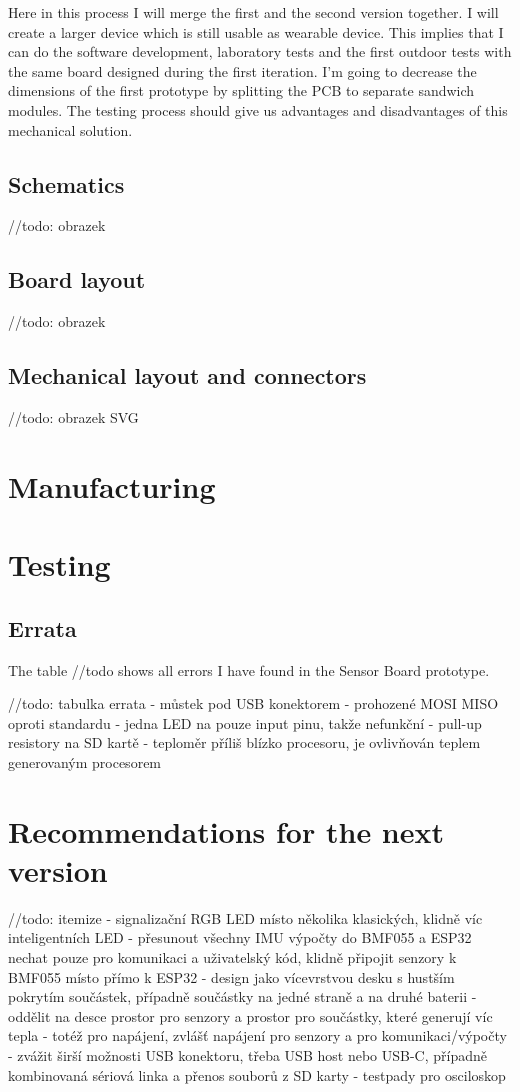 \documentclass[12pt,a4paper]{article}
\begin{document}
Here in this process I will merge the first and the second version together. I will create a larger device which is still usable as wearable device. This implies that I can do the software development, laboratory tests and the first outdoor tests with the same board designed during the first iteration. I'm going to decrease the dimensions of the first prototype by splitting the PCB to separate sandwich modules. The testing process should give us advantages and disadvantages of this mechanical solution.

\subsection{Schematics}
//todo: obrazek

\subsection{Board layout}
//todo: obrazek

\subsection{Mechanical layout and connectors}
//todo: obrazek SVG

\section{Manufacturing}

\section{Testing}

\subsection{Errata}
The table //todo shows all errors I have found in the Sensor Board prototype.

//todo: tabulka errata
- můstek pod USB konektorem
- prohozené MOSI MISO oproti standardu
- jedna LED na pouze input pinu, takže nefunkční
- pull-up resistory na SD kartě
- teploměr příliš blízko procesoru, je ovlivňován teplem generovaným procesorem

\section{Recommendations for the next version}

//todo: itemize
- signalizační RGB LED místo několika klasických, klidně víc inteligentních LED
- přesunout všechny IMU výpočty do BMF055 a ESP32 nechat pouze pro komunikaci a uživatelský kód, klidně připojit senzory k BMF055 místo přímo k ESP32
- design jako vícevrstvou desku s hustším pokrytím součástek, případně součástky na jedné straně a na druhé baterii
- oddělit na desce prostor pro senzory a prostor pro součástky, které generují víc tepla
- totéž pro napájení, zvlášť napájení pro senzory a pro komunikaci/výpočty
- zvážit širší možnosti USB konektoru, třeba USB host nebo USB-C, případně kombinovaná sériová linka a přenos souborů z SD karty
- testpady pro osciloskop
\end{document}
